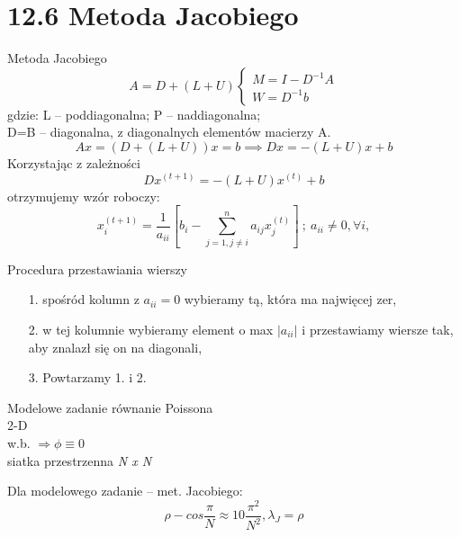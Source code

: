 \section{12.6 Metoda Jacobiego}

\begin{frame}{Metoda Jacobiego}
  $$
  A=D+(L+U)
  \begin{cases}
  M=I-D^{-1}A\\
  W=D^{-1}b
  \end{cases}
  $$
  gdzie: L -- poddiagonalna; P -- naddiagonalna;\\
  D=B -- diagonalna, z diagonalnych elementów macierzy A.
  $$Ax = (D+(L+U))x = b \implies Dx = -(L+U)x + b$$
  Korzystając z zależności
  $$\boxed{Dx^{(t+1)}= -(L+U)x^{(t)}+b}$$
  otrzymujemy wzór roboczy:
  $$x_i^{(t+1)}=\frac{1}{a_{ii}}[b_i-\sum_{j=1,j\neq i}^{n} a_{ij}x_j^{(t)}]\  ;\  a_{ii} \neq 0, \forall i,$$
\end{frame}

\begin{frame}
  \begin{block}{Procedura przestawiania wierszy}
    \begin{itemize}
      \item[1.] spośród kolumn z $a_{ii} = 0$ wybieramy tą, która ma najwięcej zer,
      \item[2.] w tej kolumnie wybieramy element o max $|a_{ii}|$ i przestawiamy wiersze tak, aby znalazł się on na diagonali,
      \item[3.] Powtarzamy 1. i 2.
    \end{itemize}
  \end{block}
\end{frame}

\begin{frame}{}
  \begin{block}{Modelowe zadanie}
    równanie Poissona
    \\2-D
    \\w.b. $\Rightarrow\phi\equiv 0$
    \\siatka przestrzenna \emph{N x N}
  \end{block}

  \begin{block}{Dla modelowego zadanie -- met. Jacobiego:}
    $$\rho - cos\frac{\pi}{N}\approx 1 0 \frac{\pi^2}{N^2}, \lambda _J = \rho$$
  \end{block}
\end{frame}

